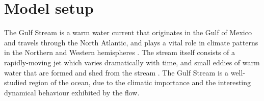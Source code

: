 \section{Model setup}\label{sec:appl_ocean}
The Gulf Stream is a warm water current that originates in the Gulf of Mexico and travels through the North Atlantic, and plays a vital role in climate patterns in the Northern and Western hemispheres \citep{Palter_2015_RoleGulfStream}.
The stream itself consists of a rapidly-moving jet which varies dramatically with time, and small eddies of warm water that are formed and shed from the stream \citep{KangCurchitser_2013_GulfStreamEddy}.
The Gulf Stream is a well-studied region of the ocean, due to the climatic importance and the interesting dynamical behaviour exhibited by the flow.

